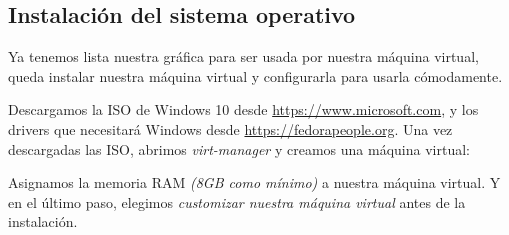 \documentclass[12pt]{article}
\begin{document}
\subsection{Instalación del sistema operativo}

Ya tenemos lista nuestra gráfica para ser usada por nuestra máquina virtual, queda instalar nuestra máquina virtual y configurarla para usarla cómodamente.

\medskip
Descargamos la ISO de Windows 10 desde \href{https://www.microsoft.com/en-us/software-download/windows10ISO}{https://www.microsoft.com}, y los drivers que necesitará Windows desde \href{https://fedorapeople.org/groups/virt/virtio-win/direct-downloads/stable-virtio/virtio-win.iso}{https://fedorapeople.org}. Una vez descargadas las ISO, abrimos \emph{virt-manager} y creamos una máquina virtual:

\medskip
Asignamos la memoria RAM \emph{(8GB como mínimo)} a nuestra máquina virtual. Y en el último paso, elegimos \emph{customizar nuestra máquina virtual} antes de la instalación.
\end{document}
